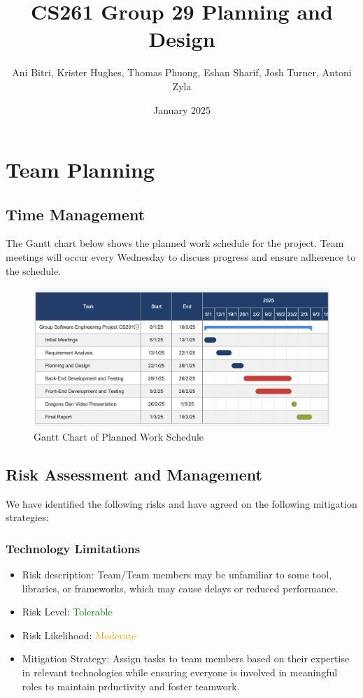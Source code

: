 \documentclass{article}
\title{CS261 Group 29 Planning and Design}
\author{Ani Bitri, Krister Hughes, Thomas Phuong, Eshan Sharif, Josh Turner, Antoni Zyla}
\date{January 2025}
\begin{document}
\maketitle


\section{Team Planning}
\subsection{Time Management}
The Gantt chart below shows the planned work schedule for the project. Team meetings will occur every Wednesday to discuss progress and ensure adherence to the schedule.

\begin{figure}[H]
    \centering
    \includegraphics[width=\textwidth]{ganttchart.png}
    \caption{Gantt Chart of Planned Work Schedule}
    \label{fig:gantt_chart}
\end{figure}


\subsection{Risk Assessment and Management}
We have identified the following risks and have agreed on the following mitigation strategies:
\subsubsection{Technology Limitations}
\begin{itemize}
    \item Risk description: Team/Team members may be unfamiliar to some tool, libraries, or frameworks, which may cause delays or reduced performance. 
    \item Risk Level: \textcolor{green}{Tolerable}
    \item Risk Likelihood: \textcolor{orange}{Moderate}
    \item Mitigation Strategy: Assign tasks to team members based on their expertise in relevant technologies while ensuring everyone is involved in meaningful roles to maintain prductivity and foster teamwork.
\end{itemize}
\end{document}
